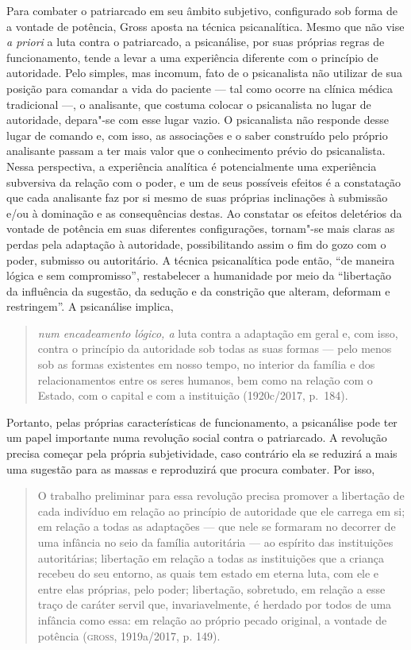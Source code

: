 Para combater o patriarcado em seu âmbito subjetivo, configurado sob
forma de a vontade de potência, Gross aposta na técnica psicanalítica.
Mesmo que não vise \emph{a priori} a luta contra o patriarcado, a
psicanálise, por suas próprias regras de funcionamento, tende a levar a
uma experiência diferente com o princípio de autoridade. Pelo simples,
mas incomum, fato de o psicanalista não utilizar de sua posição para
comandar a vida do paciente --- tal como ocorre na clínica médica
tradicional ---, o analisante, que costuma colocar o psicanalista no
lugar de autoridade, depara"-se com esse lugar vazio. O psicanalista não
responde desse lugar de comando e, com isso, as associações e o saber
construído pelo próprio analisante passam a ter mais valor que o
conhecimento prévio do psicanalista. Nessa perspectiva, a experiência
analítica é potencialmente uma experiência subversiva da relação com o
poder, e um de seus possíveis efeitos é a constatação que cada
analisante faz por si mesmo de suas próprias inclinações à submissão
e/ou à dominação e as consequências destas. Ao constatar os efeitos
deletérios da vontade de potência em suas diferentes configurações,
tornam"-se mais claras as perdas pela adaptação à autoridade,
possibilitando assim o fim do gozo com o poder, submisso ou autoritário.
A técnica psicanalítica pode então, ``de maneira lógica e sem
compromisso'', restabelecer a humanidade por meio da ``libertação da
influência da sugestão, da sedução e da constrição que alteram, deformam
e restringem''. A psicanálise implica,

\begin{quote}
\emph{num encadeamento lógico, a} luta contra a adaptação em geral e, com
isso, contra o princípio da autoridade sob todas as suas formas --- pelo
menos sob as formas existentes em nosso tempo, no interior da família e
dos relacionamentos entre os seres humanos, bem como na relação com o
Estado, com o capital e com a instituição (1920c/2017, p.~184).
\end{quote}

Portanto, pelas próprias características de funcionamento, a psicanálise
pode ter um papel importante numa revolução social contra o patriarcado.
A revolução precisa começar pela própria subjetividade, caso contrário
ela se reduzirá a mais uma sugestão para as massas e reproduzirá que
procura combater. Por isso,

\begin{quote}
O trabalho preliminar para essa revolução precisa promover a
libertação de cada indivíduo em relação ao princípio de autoridade que
ele carrega em si; em relação a todas as adaptações --- que nele se
formaram no decorrer de uma infância no seio da família autoritária ---
ao espírito das instituições autoritárias; libertação em relação a todas
as instituições que a criança recebeu do seu entorno, as quais tem
estado em eterna luta, com ele e entre elas próprias, pelo
poder; libertação, sobretudo, em relação a esse traço de caráter
servil que, invariavelmente, é herdado por todos de uma infância como
essa: em relação ao próprio pecado original, a vontade de
potência (\textsc{gross}, 1919a/2017, p. 149).
\end{quote}


